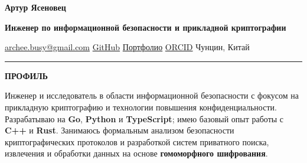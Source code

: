 \documentclass[11pt,a4paper]{article}
\newcommand{\cvrow}[2]{%
  \noindent
  \begin{minipage}[t]{0.145\textwidth}
    \vspace{0pt}%
    \raggedright
    \fontsize{8.5}{10}\selectfont
    \bfseries\MakeUppercase{#1}
  \end{minipage}%
  \hfill
  \begin{minipage}[t]{0.835\textwidth}
    \vspace{0pt}%
    #2
  \end{minipage}\par
}
\begin{document}
{\fontsize{24}{28}\selectfont\bfseries Артур Ясеновец}\par
\vspace{0.08em}
{\large\bfseries Инженер по информационной безопасности и прикладной криптографии}\par
\vspace{0.28em}
\href{mailto:archee.busy@gmail.com}{archee.busy@gmail.com}
\;\textbullet\;
\href{https://github.com/iasenovets}{GitHub}
\;\textbullet\;
\href{https://iasenovets.github.io/}{Портфолио}
\;\textbullet\;
\href{https://orcid.org/0009-0008-0008-3746}{ORCID}
\;\textbullet\;
Чунцин, Китай
\par
\vspace{0.22em}
\hrule
\vspace{0.55em}

\cvrow{Профиль}{%
  Инженер и исследователь в области информационной безопасности
  с фокусом на прикладную криптографию и технологии повышения
  конфиденциальности. Разрабатываю на \textbf{Go},
  \textbf{Python} и \textbf{TypeScript}; имею базовый опыт работы
  с \textbf{C++} и \textbf{Rust}. Занимаюсь формальным анализом
  безопасности криптографических протоколов и разработкой систем
  приватного поиска, извлечения и обработки данных на основе
  \textbf{гомоморфного шифрования}.
}

\vspace{0.50em}
\end{document}
